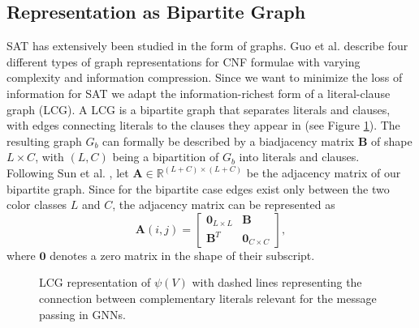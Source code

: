 \subsection{Representation as Bipartite Graph}
SAT has extensively been studied in the form of graphs. Guo et al. \cite{guo2023machine} describe four different types of graph representations for CNF formulae with varying complexity and information compression. Since we want to minimize the loss of information for SAT we adapt the information-richest form of a literal-clause graph (LCG). 
A LCG is a bipartite graph that separates literals and clauses, with edges connecting literals to the clauses they appear in (see Figure \ref{fig:lcg-sat}).
The resulting graph $G_b$ can formally be described by a biadjacency matrix $\mathbf{B}$ of shape $L \times C$, with $(L,C)$ being a bipartition of $G_b$ into literals and clauses. \\
Following Sun et al. \cite{articleBiadjacency}, let $\mathbf{A} \in \mathbb{R}^{(L+C) \times (L+C)}$ be the adjacency matrix of our bipartite graph. Since for the bipartite case edges exist only between the two color classes $L$ and $C$, the adjacency matrix can be represented as
\begin{equation}
    \mathbf{A}(i,j) = \begin{bmatrix}
        \mathbf{0}_{L \times L} & \mathbf{B} \\
        \mathbf{B}^T & \mathbf{0}_{C \times C}
    \end{bmatrix},
\end{equation}
where $\mathbf{0}$ denotes a zero matrix in the shape of their subscript. \bigskip

\begin{figure}[h]
    \centering
    \caption[Bipartite graph in LCG]{LCG representation of $\psi(V)$ with dashed lines representing the connection between complementary literals relevant for the message passing in GNNs.}
    \label{fig:lcg-sat}
\end{figure}

